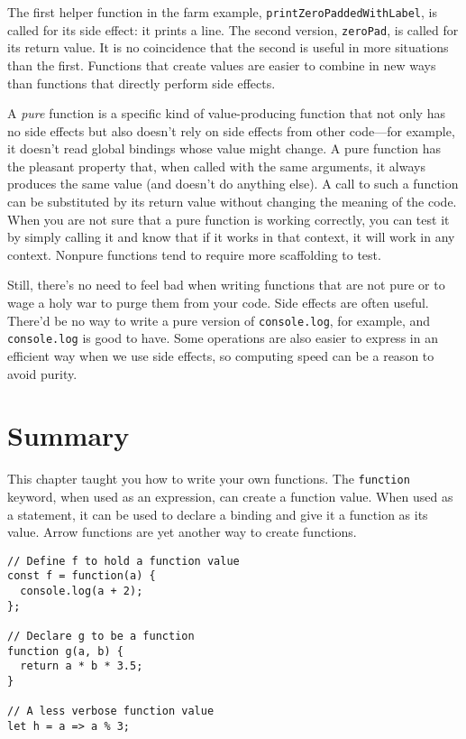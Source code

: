 The first helper function in the farm example, \lstinline`printZeroPaddedWithLabel`, is called for its side effect: it prints a line. The second version, \lstinline`zeroPad`, is called for its return value. It is no coincidence that the second is useful in more situations than the first. Functions that create values are easier to combine in new ways than functions that directly perform side effects.

A \emph{pure} function is a specific kind of value-producing function that not only has no side effects but also doesn't rely on side effects from other code—for example, it doesn't read global bindings whose value might change. A pure function has the pleasant property that, when called with the same arguments, it always produces the same value (and doesn't do anything else). A call to such a function can be substituted by its return value without changing the meaning of the code. When you are not sure that a pure function is working correctly, you can test it by simply calling it and know that if it works in that context, it will work in any context. Nonpure functions tend to require more scaffolding to test.

Still, there's no need to feel bad when writing functions that are not pure or to wage a holy war to purge them from your code. Side effects are often useful. There'd be no way to write a pure version of \lstinline`console.log`, for example, and \lstinline`console.log` is good to have. Some operations are also easier to express in an efficient way when we use side effects, so computing speed can be a reason to avoid purity.

\section{Summary}

This chapter taught you how to write your own functions. The \lstinline`function` keyword, when used as an expression, can create a function value. When used as a statement, it can be used to declare a binding and give it a function as its value. Arrow functions are yet another way to create functions.

\begin{lstlisting}
// Define f to hold a function value
const f = function(a) {
  console.log(a + 2);
};

// Declare g to be a function
function g(a, b) {
  return a * b * 3.5;
}

// A less verbose function value
let h = a => a % 3;
\end{lstlisting}
\noindent

